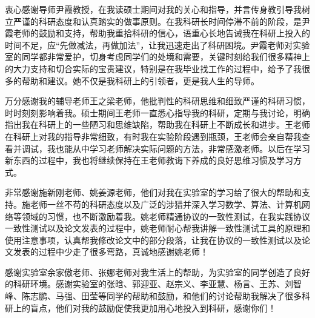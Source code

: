 \begin{acknowledgement}
  衷心感谢导师尹霞教授，在我读硕士期间对我的关心和指导，并言传身教引导我树立严谨的科研态度和认真踏实的做事原则。在我科研长时间停滞不前的阶段，是尹霞老师的鼓励和支持，帮助我重拾科研的信心，语重心长地告诫我在科研上投入的时间不足，应“先做减法，再做加法”，让我迅速走出了科研困境。尹霞老师对实验室的同学都非常爱护，切身考虑同学们的处境和需要，关键时刻给我们很多精神上的大力支持和切合实际的宝贵建议，特别是在我毕业找工作的过程中，给予了我很多的帮助和建议。她不仅是我科研上的引领者，更是我人生的导师。

  万分感谢我的辅导老师王之梁老师，他批判性的科研思维和细致严谨的科研习惯，时时刻刻影响着我。硕士期间王老师一直悉心指导我的科研，定期与我讨论，明确指出我在科研上的一些陋习和思维缺陷，帮助我在科研上不断成长和进步。王老师在科研上对我的指导非常细致，有时我在实验阶段遇到瓶颈，王老师会亲自帮我查看并调试，我也能从中学习老师解决实际问题的方法，非常感激老师。以后在学习新东西的过程中，我也将继续保持在王老师教诲下养成的良好思维习惯及学习方式。

  非常感谢施新刚老师、姚姜源老师，他们对我在实验室的学习给了很大的帮助和支持。施老师一丝不苟的科研态度以及广泛的涉猎并深入学习数学、算法、计算机网络等领域的习惯，也不断激励着我。姚老师精通协议的一致性测试，在我实践协议一致性测试以及论文发表的过程中，姚老师耐心帮我讲解一致性测试工具的原理和使用注意事项，认真帮我修改论文中的部分段落，让我在协议的一致性测试以及论文发表的过程中少走了很多弯路，真诚地感谢姚老师！

  感谢实验室余家傲老师、张娜老师对我生活上的帮助，为实验室的同学创造了良好的科研环境。感谢实验室的张晗、郭迎亚、赵宗义、李亚慧、杨言、王苏、刘智峰、陈志鹏、马强、田莹等同学的帮助和鼓励，和他们的讨论帮助我解决了很多科研上的盲点，他们对我的鼓励促使我更加用心地投入到科研，感谢你们！


\end{acknowledgement}
